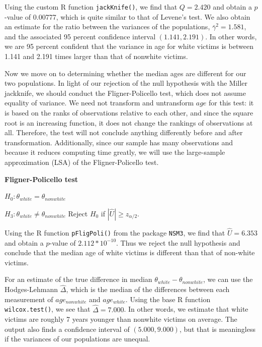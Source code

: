 \par \bigskip Using the custom R function \texttt{jackKnife()}, we find that $Q = 2.420$ and obtain a $p$-value of 0.00777, which is quite similar to that of Levene's test. We also obtain an estimate for the ratio between the variances of the populations, $\bar{\gamma}^2 = 1.581$, and the associated 95 percent confidence interval $(1.141, 2.191)$. In other words, we are 95 percent confident that the variance in age for white victims is between 1.141 and 2.191 times larger than that of nonwhite victims.

\par \bigskip Now we move on to determining whether the median ages are different for our two populations. In light of our rejection of the null hypothesis with the Miller jackknife, we should conduct the Fligner-Policello test, which does not assume equality of variance. We need not transform and untransform $age$ for this test: it is based on the ranks of observations relative to each other, and since the square root is an increasing function, it does not change the rankings of observations at all. Therefore, the test will not conclude anything differently before and after transformation. Additionally, since our sample has many observations and because it reduces computing time greatly, we will use the large-sample approximation (LSA) of the Fligner-Policello test.

\bigskip \textbf{Fligner-Policello test}

\bigskip $H_0: \theta_{white} = \theta_{nonwhite}$

$H_3: \theta_{white} \not= \theta_{nonwhite}$ \hspace{1in} Reject $H_0$ if $|\hat{U}| \ge z_{\alpha/2}$.

\par \bigskip Using the R function \texttt{pFligPoli()} from the package \texttt{NSM3}, we find that $\hat{U} = 6.353$ and obtain a $p$-value of $2.112*10^{-10}$. Thus we reject the null hypothesis and conclude that the median age of white victims is different than that of non-white victims.

\par \bigskip For an estimate of the true difference in median $\theta_{white} - \theta_{nonwhite}$, we can use the Hodges-Lehmann $\hat{\Delta}$, which is the median of the differences between each measurement of $age_{nonwhite}$ and $age_{white}$. Using the base R function \texttt{wilcox.test()}, we see that $\hat{\Delta} = 7.000$. In other words, we estimate that white victims are roughly 7 years younger than nonwhite victims on average. The output also finds a confidence interval of $(5.000, 9.000)$, but that is meaningless if the variances of our populations are unequal.

